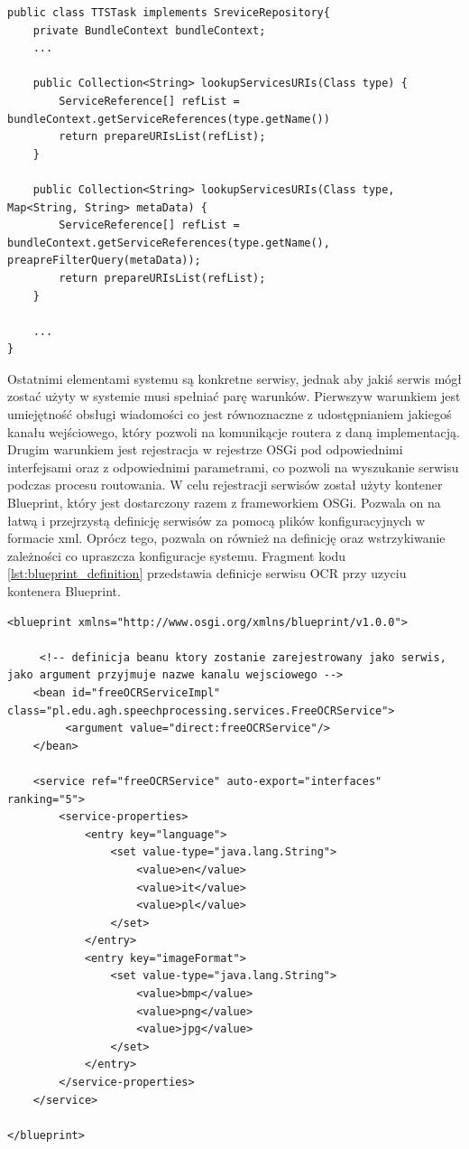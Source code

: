 \begin{center}
\begin{lstlisting}
public class TTSTask implements SreviceRepository{
	private BundleContext bundleContext;
	...
	
	public Collection<String> lookupServicesURIs(Class type) {
		ServiceReference[] refList = bundleContext.getServiceReferences(type.getName())
		return prepareURIsList(refList);
	}

	public Collection<String> lookupServicesURIs(Class type, Map<String, String> metaData) {
		ServiceReference[] refList = bundleContext.getServiceReferences(type.getName(), preapreFilterQuery(metaData));
		return prepareURIsList(refList);
	}

	...
}

\end{lstlisting}
\end{center}
Ostatnimi elementami systemu są konkretne serwisy, jednak aby jakiś serwis mógł zostać użyty w systemie musi spełniać parę warunków. Pierwszyw warunkiem jest umiejętność obsługi wiadomości co jest równoznaczne z udostępnianiem jakiegoś kanału wejściowego, który pozwoli na komunikącje routera z daną implementacją. Drugim warunkiem jest rejestracja w rejestrze OSGi pod odpowiednimi interfejsami oraz z odpowiednimi parametrami, co pozwoli na wyszukanie serwisu podczas procesu routowania. W celu rejestracji serwisów został użyty kontener Blueprint, który jest dostarczony razem z frameworkiem OSGi. Pozwala on na łatwą i przejrzystą definicję serwisów za pomocą plików konfiguracyjnych w formacie xml. Oprócz tego, pozwala on również na definicję oraz wstrzykiwanie zależności co upraszcza konfiguracje systemu. Fragment kodu \ref{lst:blueprint_definition} przedstawia definicje serwisu OCR przy uzyciu kontenera Blueprint.

\lstset{language=XML, tabsize=4, caption=Definicja serwisu OCR przy użyciue kontenera Blueprint.,label=lst:blueprint_definition}

\begin{center}
\begin{lstlisting}
<blueprint xmlns="http://www.osgi.org/xmlns/blueprint/v1.0.0">

	 <!-- definicja beanu ktory zostanie zarejestrowany jako serwis, jako argument przyjmuje nazwe kanalu wejsciowego -->
	<bean id="freeOCRServiceImpl" class="pl.edu.agh.speechprocessing.services.FreeOCRService">
		 <argument value="direct:freeOCRService"/> 
	</bean>

	<service ref="freeOCRService" auto-export="interfaces" ranking="5">
		<service-properties>
			<entry key="language">
				<set value-type="java.lang.String">
					<value>en</value>
					<value>it</value>
					<value>pl</value>
				</set> 
			</entry>
			<entry key="imageFormat">
				<set value-type="java.lang.String">
					<value>bmp</value>
					<value>png</value>
					<value>jpg</value>
				</set> 
			</entry>
		</service-properties>
	</service>

</blueprint>

\end{lstlisting}
\end{center}

